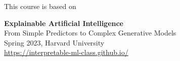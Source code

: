 \begin{block}{This course is based on}
\begin{center}


\textbf{Explainable Artificial Intelligence} \\
From Simple Predictors to Complex Generative Models\\
\vspace{.25cm}
Spring 2023, Harvard University \\
\vspace{.25cm}
\url{https://interpretable-ml-class.github.io/}

\end{center}
\end{block}
